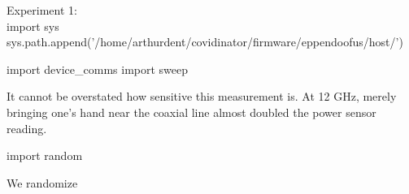 \documentclass[paper.tex]{subfiles}%
\begin{document}
\clearpage
{\Large Experiment 1:}\\


\endmoddef\nwstartdeflinemarkup\nwenddeflinemarkup
import sys
sys.path.append('/home/arthurdent/covidinator/firmware/eppendoofus/host/')

import device_comms
import sweep

\nwendcode{}\nwdocspar

It cannot be overstated how sensitive this measurement is. At 12 GHz, merely bringing one's hand near the coaxial line almost doubled
the power sensor reading.

\nwenddocs{}\moddef{}\endmoddef\nwstartdeflinemarkup\nwenddeflinemarkup
import random

\nwendcode{}\nwdocspar

We randomize \cite{first2000}

\nwenddocs{}\moddef{}\plusendmoddef\nwstartdeflinemarkup\nwenddeflinemarkup





\nwendcode{}\nwdocspar
\end{document}
